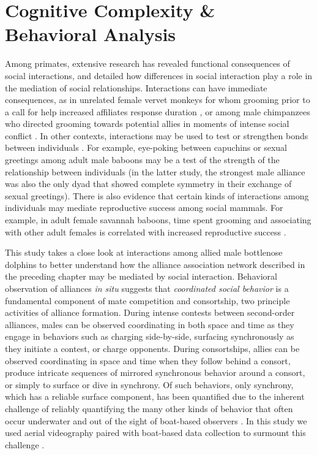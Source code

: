 \documentclass[11pt]{amsart}
\begin{document}
\section{Cognitive Complexity \& Behavioral Analysis}
Among primates, extensive research has revealed functional consequences of social interactions, and detailed how differences in social interaction play a role in the mediation of social relationships. Interactions can have immediate consequences, as in unrelated female vervet monkeys for whom grooming prior to a call for help increased affiliates response duration \citep{seyfarth+cheney:1984}, or among male chimpanzees who directed grooming towards potential allies in moments of intense social conflict \citep{nishida:1983}. In other contexts, interactions may be used to test or strengthen bonds between individuals \citep{zahavi:1977}. For example, eye-poking between capuchins \citep{perry:2011} or sexual greetings among adult male baboons \citep{smuts:1990} may be a test of the strength of the relationship between individuals (in the latter study, the strongest male alliance was also the only dyad that showed complete symmetry in their exchange of sexual greetings). There is also evidence that certain kinds of interactions among individuals may mediate reproductive success among social mammals. For example, in adult female savannah baboons, time spent grooming and associating with other adult females is correlated with increased reproductive success \citep{silk:2003}.

This study takes a close look at interactions among allied male bottlenose dolphins to better understand how the alliance association network described in the preceding chapter may be mediated by social interaction. Behavioral observation of alliances \emph{in situ} suggests that \emph{coordinated social behavior} is a fundamental component of mate competition and consortship, two principle activities of alliance formation. During intense contests between second-order alliances, males can be observed coordinating in both space and time as they engage in behaviors such as charging side-by-side, surfacing synchronously as they initiate a contest, or charge opponents. During consortships, allies can be observed coordinating in space and time when they follow behind a consort, produce intricate sequences of mirrored synchronous behavior around a consort, or simply to surface or dive in synchrony. Of such behaviors, only synchrony, which has a reliable surface component, has been quantified due to the inherent challenge of reliably quantifying the many other kinds of behavior that often occur underwater and out of the sight of boat-based observers \citep{connor:2006}. In this study we used aerial videography paired with boat-based data collection to surmount this challenge \citep{nowacek:2001, hodgson:2007, friedman:2014}. 
\end{document}
